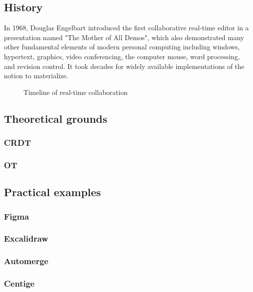 \subsection{History}

In 1968, Douglas Engelbart introduced the first collaborative real-time editor in a presentation named "The Mother of All Demos", which also demonstrated many other fundamental elements of modern personal computing including windows, hypertext, graphics, video conferencing, the computer mouse, word processing, and revision control. \cite{noauthor_firsts:_nodate}
It took decades for widely available implementations of the notion to materialize.

\begin{figure}[h]
	\centerfloat
	\startchronology[startyear=1960, height=0.1pc, arrow=false]
	\stopchronology

	\caption{Timeline of real-time collaboration}
	\label{fig:timeline-collab}
\end{figure}

\subsection{Theoretical grounds}
\subsubsection{CRDT}
\subsubsection{OT}
\subsection{Practical examples}
\subsubsection{Figma}
\subsubsection{Excalidraw}
\subsubsection{Automerge}
\subsubsection{Centige}
